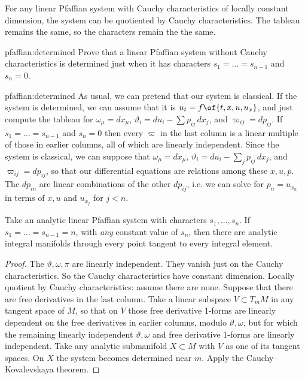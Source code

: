 For any linear Pfaffian system with Cauchy characteristics of locally constant dimension,  the system can be quotiented by Cauchy characteristics.
The tableau remains the same, so the characters remain the the same.


\begin{problem}{pfaffian:determined}
Prove that a linear Pfaffian system without Cauchy characteristics is determined just when it has characters \(s_1=\dots=s_{n-1}\) and \(s_n=0\).
\end{problem}
\begin{answer}{pfaffian:determined}
As usual, we can pretend that our system is classical.
If the system is determined, we can assume that it is \(u_t=f\of{t,x,u,u_x}\), and just compute the tableau for \(\omega_{\mu}=dx_{\mu}\), \(\vartheta_i=du_i-\sum p_{ij} \, dx_j\), and \(\varpi_{ij} = dp_{ij}\).
If \(s_1=\dots=s_{n-1}\) and \(s_n=0\) then every \(\varpi\) in the last column is a linear multiple of those in earlier columns, all of which are linearly independent.
Since the system is classical, we can suppose that \(\omega_{\mu}=dx_{\mu}\), \(\vartheta_i=du_i-\sum_j p_{ij} \, dx_j\), and \(\varpi_{ij} = dp_{ij}\), so that our differential equations are relations among these \(x,u,p\).
The \(dp_{in}\) are linear combinations of the other \(dp_{ij}\), i.e. we can solve for \(p_n=u_{x_n}\) in terms of \(x,u\) and \(u_{x_j}\) for \(j < n\).
\end{answer}

\begin{proposition}
Take an analytic linear Pfaffian system with characters \(s_1, \dots, s_n\).
If \(s_1=\dots=s_{n-1}=n\), with \emph{any} constant value of \(s_n\), then there are analytic integral manifolds through every point tangent to every integral element.
\end{proposition}
\begin{proof}
The \(\vartheta, \omega, \pi\) are linearly independent.
They vanish just on the Cauchy characteristics. 
So the Cauchy characteristics have constant dimension.
Locally quotient by Cauchy characteristics: assume there are none.
Suppose that there are free derivatives in the last column. 
Take a linear subspace \(V \subset T_m M\) in any tangent space of \(M\), so that on \(V\) those free derivative 1-forms are linearly dependent on the free derivatives in earlier columns, modulo \(\vartheta, \omega\), but for which the remaining linearly independent \(\vartheta,\omega\) and free derivative 1-forms are linearly independent.
Take any analytic submanifold \(X \subset M\)  with \(V\) as one of its tangent spaces.
On \(X\) the system becomes determined near \(m\).
Apply the Cauchy--Kovalevskaya theorem.
\end{proof}




